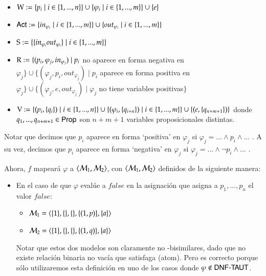 \begin{demostracion}
    \begin{itemize}
        \item $\W := \{p_i\mid i\in\{1,...,n\}\} \cup \{\varphi_i \mid i \in \{1,...,m\}\} \cup \{e\}$
        \item $\ACT := \{in_{\varphi_i} \mid i \in \{1,...,m\}\} \cup \{out_{\varphi_i} \mid i \in \{1,...,m\}\}$
        \item $\S := \{\{in_{\varphi_i}out_{\varphi_i}\} \mid i \in \{1,...,m\}\}$
        \item $\R := \{(p_i,\varphi_j,in_{\varphi_j}) \mid p_i$ no aparece en forma negativa en $\varphi_j\} \cup 
                     \{(\varphi_j,p_i,out_{\varphi_j})\mid p_i$ aparece en forma positiva en $\varphi_j\} \cup 
                     \{(\varphi_j,e,out_{\varphi_j}) \mid \varphi_j$ no tiene variables positivas$\}$
        \item $\V := \{(p_i,\{q_i\}) \mid i \in \{1,...,n\}\} \cup 
                     \{(\varphi_i,\{q_{i+n}\}) \mid i \in \{1,...,m\}\} \cup 
                     \{(e,\{q_{n+m+1}\})\}$ donde $q_1,...,q_{n+m+1} \in \PROP$ son $n+m+1$ variables proposicionales distintas.
    \end{itemize}

    Notar que decimos que $p_i$ aparece en forma `positiva' en $\varphi_j$ si $\varphi_j = ... \wedge p_i \wedge...$ . 
    A su vez, decimos que $p_i$ aparece en forma `negativa' en $\varphi_j$ si $\varphi_j = ...\wedge \neg p_i \wedge...$ .

    Ahora, $f$ mapeará $\varphi$ a $\tup{\modults_1,\modults_2}$, con $\tup{\modults_1,\modults_2}$ definidos de la siguiente manera:

    \begin{itemize}
        \item En el caso de que $\varphi$ evalúe a $false$ en la asignación que asigna a $p_1,...,p_n$ el valor $false$:

        \begin{itemize}
            \item $\model_1=\tup{\{1\},\{\},\{\},\{(1,p)\},\{a\}}$
            \item $\model_2=\tup{\{1\},\{\},\{\},\{(1,q)\},\{a\}}$
        \end{itemize}

        Notar que estos dos modelos son claramente no \KHilogic-bisimilares, dado que no existe relación binaria no vacía 
        que satisfaga (atom). Pero es correcto porque sólo utilizaremos esta definición en uno de los casos donde 
        $\varphi \not \in \DNFTAUT$. 
        

\end{itemize}
\end{demostracion}

